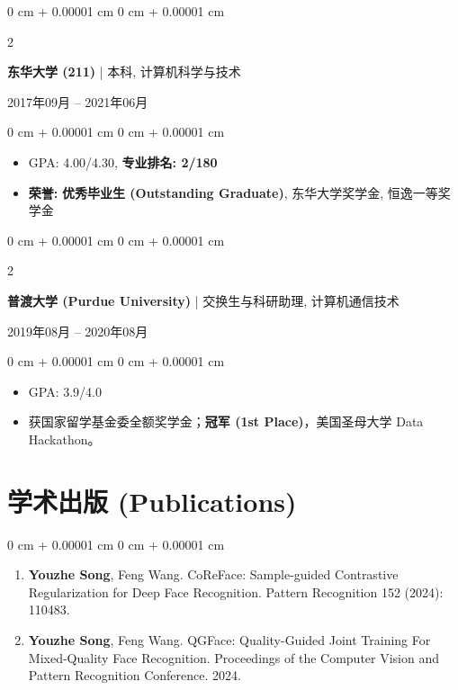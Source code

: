 \documentclass[10pt, letterpaper]{article}
\newenvironment{highlights}{
    \begin{itemize}[
        topsep=0.05 cm,
        parsep=0.05 cm,
        partopsep=0pt,
        itemsep=0pt,
        leftmargin=0.4 cm + 10pt
    ]
}{
    \end{itemize}
} %
\newenvironment{onecolentry}{
    \begin{adjustwidth}{
        0 cm + 0.00001 cm
    }{
        0 cm + 0.00001 cm
    }
}{
    \end{adjustwidth}
} %
\newenvironment{twocolentry}[2][]{
    \onecolentry
    \def\secondColumn{#2}
    \setcolumnwidth{\fill, 4.5 cm}
    \begin{paracol}{2}
}{
    \switchcolumn \raggedleft \secondColumn
    \end{paracol}
    \endonecolentry
} %
\begin{document}
        \vspace{0.2 cm}
        
        \begin{twocolentry}{
            2017年09月 – 2021年06月
        }
            \textbf{东华大学 (211)} | 本科, 计算机科学与技术
        \end{twocolentry}
        \vspace{0.10 cm}
        \begin{onecolentry}
            \begin{highlights}
                \item GPA: 4.00/4.30, \textbf{专业排名: 2/180}
                \item \textbf{荣誉:} \textbf{优秀毕业生 (Outstanding Graduate)}, 东华大学奖学金, 恒逸一等奖学金
            \end{highlights}
        \end{onecolentry}
        
        \vspace{0.2 cm}

        \begin{twocolentry}{
            2019年08月 – 2020年08月
        }
            \textbf{普渡大学 (Purdue University)} | 交换生与科研助理, 计算机通信技术
        \end{twocolentry}
        \vspace{0.10 cm}
        \begin{onecolentry}
            \begin{highlights}
                \item GPA: 3.9/4.0
                \item 获国家留学基金委全额奖学金；\textbf{冠军 (1st Place)}，美国圣母大学 Data Hackathon。
            \end{highlights}
        \end{onecolentry}
        
    \section{学术出版 (Publications)}

\begin{onecolentry}
    \begin{enumerate}[
        label=\arabic*.,
        topsep=0pt,
        parsep=0pt,
        partopsep=0pt,
        itemsep=0.2cm,
        leftmargin=*
    ]
        \item \textbf{Youzhe Song}, Feng Wang. CoReFace: Sample-guided Contrastive Regularization for Deep Face Recognition.
        Pattern Recognition 152 (2024): 110483.
        \href{https://doi.org/10.1016/j.patcog.2024.110483}{\faLink}
        \href{https://github.com/IsidoreSong/CoreFace}{\faGithub}
        
        \item \textbf{Youzhe Song}, Feng Wang. QGFace: Quality-Guided Joint Training For Mixed-Quality Face Recognition.
        Proceedings of the Computer Vision and Pattern Recognition Conference. 2024. \href{https://arxiv.org/abs/2312.17494}{\faLink}
        \href{https://github.com/IsidoreSong/QGFace}{\faGithub}
    \end{enumerate}
\end{onecolentry}
\end{document}
